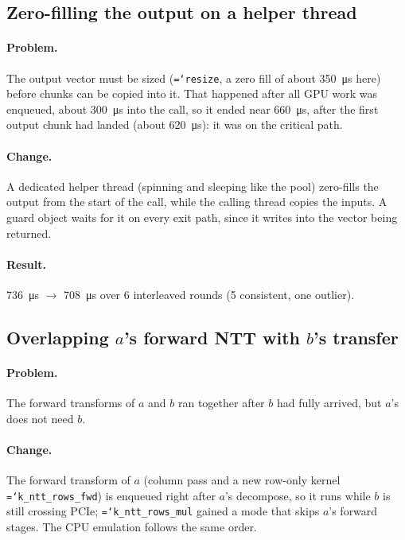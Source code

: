 \documentclass[11pt,a4paper]{article}
\newcommand{\code}[1]{\texttt{\hyphenchar\font=`\-\relax #1}}
\newcommand{\us}[1]{\SI{#1}{\micro\second}}
\begin{document}
\subsection{Zero-filling the output on a helper thread}

\paragraph{Problem.} The output vector must be sized (\code{resize}, a zero fill
of about \us{350} here) before chunks can be copied into it. That happened after all
GPU work was enqueued, about \us{300} into the call, so it ended near \us{660},
after the first output chunk had landed (about \us{620}): it was on the critical path.

\paragraph{Change.} A dedicated helper thread (spinning and sleeping like the pool)
zero-fills the output from the start of the call, while the calling thread copies
the inputs. A guard object waits for it on every exit path, since it writes into
the vector being returned.

\paragraph{Result.} \us{736} $\to$ \us{708} over 6 interleaved rounds (5 consistent,
one outlier).

\subsection{Overlapping $a$'s forward NTT with $b$'s transfer}

\paragraph{Problem.} The forward transforms of $a$ and $b$ ran together after $b$ had
fully arrived, but $a$'s does not need $b$.

\paragraph{Change.} The forward transform of $a$ (column pass and a new row-only
kernel \code{k\_ntt\_rows\_fwd}) is enqueued right after $a$'s decompose, so it runs
while $b$ is still crossing PCIe; \code{k\_ntt\_rows\_mul} gained a mode that skips
$a$'s forward stages. The CPU emulation follows the same order.
\end{document}
